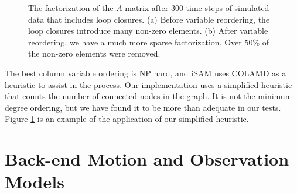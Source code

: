 \documentclass[conference]{IEEEtran}
\begin{document}
\begin{figure}[!h]
  \begin{center}
    \caption{The factorization of the $A$ matrix after 300 time steps of simulated data
      that includes loop closures. (a) Before variable reordering, the loop closures
      introduce many non-zero elements. (b) After variable reordering, we have a much more
    sparse factorization. Over 50\% of the non-zero elements were removed.}
    \label{fig:reorder}
  \end{center}
\end{figure}


The best column variable ordering is NP hard, and iSAM uses COLAMD as a heuristic to
assist in the process. \cite{davis2004column} Our implementation uses a simplified
heuristic that counts the number of connected nodes in the graph. It is not the minimum
degree ordering, but we have found it to be more than adequate in our tests. Figure
\ref{fig:reorder} is an example of the application of our simplified heuristic.

\section{Back-end Motion and Observation Models}
\label{sec:backendModels}
\end{document}
